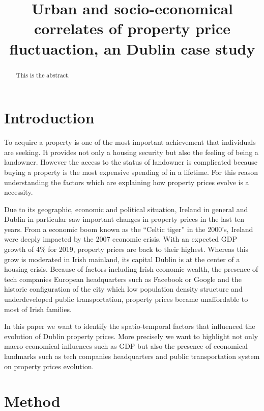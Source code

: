 \documentclass[]{elsarticle} %
\begin{document}
\begin{frontmatter}

  \title{Urban and socio-economical correlates of property price fluctuaction, an
Dublin case study}
    
  \begin{abstract}
  This is the abstract.
  \end{abstract}
  
 \end{frontmatter}

\hypertarget{introduction}{%
\section{Introduction}\label{introduction}}

To acquire a property is one of the most important achievement that
individuals are seeking. It provides not only a housing security but
also the feeling of being a landowner. However the access to the status
of landowner is complicated because buying a property is the most
expensive spending of in a lifetime. For this reason understanding the
factors which are explaining how property prices evolve is a necessity.

Due to its geographic, economic and political situation, Ireland in
general and Dublin in particular saw important changes in property
prices in the last ten years. From a economic boom known as the ``Celtic
tiger'' in the 2000's, Ireland were deeply impacted by the 2007 economic
crisis. With an expected GDP growth of 4\% for 2019, property prices are
back to their highest. Whereas this grow is moderated in Irish mainland,
its capital Dublin is at the center of a housing crisis. Because of
factors including Irish economic wealth, the presence of tech companies
European headquarters such as Facebook or Google and the historic
configuration of the city which low population density structure and
underdeveloped public transportation, property prices became
unaffordable to most of Irish families.

In this paper we want to identify the spatio-temporal factors that
influenced the evolution of Dublin property prices. More precisely we
want to highlight not only macro economical influences such as GDP but
also the presence of economical landmarks such as tech companies
headquarters and public transportation system on property prices
evolution.

\hypertarget{method}{%
\section{Method}\label{method}}
\end{document}
